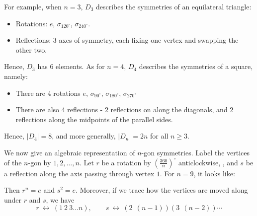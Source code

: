 For example, when $n=3$, $D_3$ describes the symmetries of an equilateral triangle:
    \begin{itemize}
        \item Rotations: $e$, $\sigma_{120^\circ}$, $\sigma_{240^\circ}$.
        \item Reflections: 3 axes of symmetry, each fixing one vertex and swapping the other two.
    \end{itemize}
Hence, $D_3$ has 6 elements.
As for $n=4$, $D_4$ describes the symmetries of a square, namely:
    \begin{itemize}
        \item There are 4 rotations $e$, $\sigma_{90^\circ}$, $\sigma_{180^\circ}$, $\sigma_{270^\circ}$
        \item There are also 4 reflections - 2 reflections on along the diagonals, and 2 reflections along the midpoints of the parallel sides.
    \end{itemize}
Hence, $|D_4| = 8$, and more generally, $|D_n| = 2n$ for all $n \ge 3$.

We now give an algebraic representation of $n$-gon symmetries. Label the vertices of the $n$-gon by $1, 2, \dots, n$. Let $r$ be a rotation by $\left(\frac{360}{n}\right)^\circ$ anticlockwise, , and $s$ be a reflection along the axis passing through vertex $1$. For $n = 9$, it looks like:
\begin{center}
\end{center}
Then $r^n = e$ and $s^2 = e$. Moreover, if we trace how the vertices are moved along under $r$ and $s$, we have 
$$r\ \longleftrightarrow \ (1\ 2\ 3 \dots n),\quad \quad s\ \longleftrightarrow\ (2\ \ (n-1))(3\ \ (n-2)) \cdots$$

